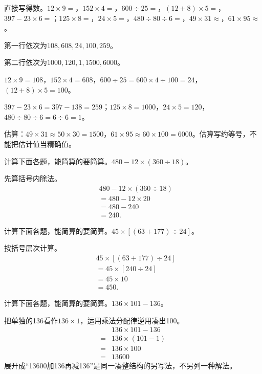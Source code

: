 直接写得数。\(12\times9=\)，\allowbreak{}\(152\times4=\)，\allowbreak{}\(600\div25=\)，\allowbreak{}\((12+8)\times5=\)，\allowbreak{}\(397-23\times6=\)；\allowbreak{}\(125\times8=\)，\allowbreak{}\(24\times5=\)，\allowbreak{}\(480\div80\div6=\)，\allowbreak{}\(49\times31\approx\)，\allowbreak{}\(61\times95\approx\)。\par
\begin{BookAnswer}
第一行依次为\(108,608,24,100,259\)。\par 第二行依次为\(1000,120,1,1500,6000\)。\par \(12\times9=108\)，\allowbreak{}\(152\times4=608\)，\allowbreak{}\(600\div25=600\times4\div100=24\)，\allowbreak{}\((12+8)\times5=100\)。\par \(397-23\times6=397-138=259\)；\allowbreak{}\(125\times8=1000\)，\allowbreak{}\(24\times5=120\)，\allowbreak{}\(480\div80\div6=6\div6=1\)。\par 估算：\(49\times31\approx50\times30=1500\)，\allowbreak{}\(61\times95\approx60\times100=6000\)。估算写约等号，不能把估计值当精确值。
\end{BookAnswer}

计算下面各题，能简算的要简算。\(480-12\times(360\div18)\)。\par
\begin{BookAnswer}
先算括号内除法。\[\begin{aligned}&480-12\times(360\div18)\\&=480-12\times20\\&=480-240\\&=240.\end{aligned}\]
\end{BookAnswer}

计算下面各题，能简算的要简算。\(45\times[(63+177)\div24]\)。\par
\begin{BookAnswer}
按括号层次计算。\[\begin{aligned}&45\times[(63+177)\div24]\\&=45\times[240\div24]\\&=45\times10\\&=450.\end{aligned}\]
\end{BookAnswer}

计算下面各题，能简算的要简算。\(136\times101-136\)。\par
\begin{BookAnswer}
把单独的136看作\(136\times1\)，运用乘法分配律逆用凑出100。\[\begin{aligned}&136\times101-136\\={}&136\times(101-1)\\={}&136\times100\\={}&13600\end{aligned}\]展开成“13600加136再减136”是同一凑整结构的另写法，不另列一种解法。
\end{BookAnswer}

